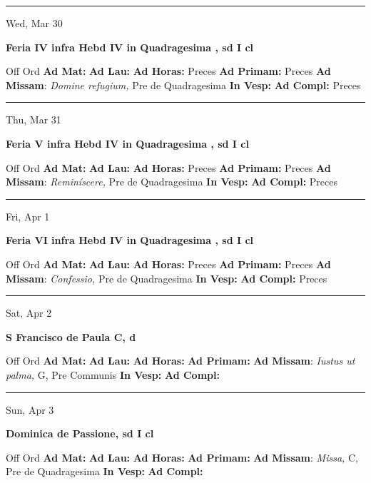 \documentclass[letterpaper, 10pt]{article}
\begin{document}
\hrule
\begin{center}
Wed, Mar 30
\end{center}\textbf{ \large Feria IV infra Hebd IV in Quadragesima , \textnormal{\normalsize sd I cl}}
\begin{justify}
Off Ord
\textbf{Ad Mat: }
\textbf{Ad Lau: }
\textbf{Ad Horas: }Preces
\textbf{Ad Primam: }Preces
\textbf{Ad Missam}: \textit{Domine refugium,} Pre de Quadragesima
\textbf{In Vesp: }
\textbf{Ad Compl: }Preces\end{justify}



\hrule
\begin{center}
Thu, Mar 31
\end{center}\textbf{ \large Feria V infra Hebd IV in Quadragesima , \textnormal{\normalsize sd I cl}}
\begin{justify}
Off Ord
\textbf{Ad Mat: }
\textbf{Ad Lau: }
\textbf{Ad Horas: }Preces
\textbf{Ad Primam: }Preces
\textbf{Ad Missam}: \textit{Reminíscere,} Pre de Quadragesima
\textbf{In Vesp: }
\textbf{Ad Compl: }Preces\end{justify}



\hrule
\begin{center}
Fri, Apr 1
\end{center}\textbf{ \large Feria VI infra Hebd IV in Quadragesima , \textnormal{\normalsize sd I cl}}
\begin{justify}
Off Ord
\textbf{Ad Mat: }
\textbf{Ad Lau: }
\textbf{Ad Horas: }Preces
\textbf{Ad Primam: }Preces
\textbf{Ad Missam}: \textit{Confessio,} Pre de Quadragesima
\textbf{In Vesp: }
\textbf{Ad Compl: }Preces\end{justify}



\hrule
\begin{center}
Sat, Apr 2
\end{center}\textbf{ \large S Francisco de Paula C, \textnormal{\normalsize d}}
\begin{justify}
Off Ord
\textbf{Ad Mat: }
\textbf{Ad Lau: }
\textbf{Ad Horas: }
\textbf{Ad Primam: }
\textbf{Ad Missam}: \textit{Iustus ut palma,} G, Pre Communis
\textbf{In Vesp: }
\textbf{Ad Compl: }\end{justify}



\hrule
\begin{center}
Sun, Apr 3
\end{center}\textbf{ \large Dominica de Passione, \textnormal{\normalsize sd I cl}}
\begin{justify}
Off Ord
\textbf{Ad Mat: }
\textbf{Ad Lau: }
\textbf{Ad Horas: }
\textbf{Ad Primam: }
\textbf{Ad Missam}: \textit{Missa,} C, Pre de Quadragesima
\textbf{In Vesp: }
\textbf{Ad Compl: }\end{justify}
\end{document}
